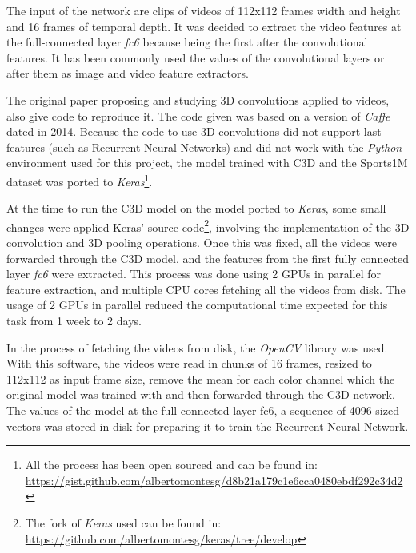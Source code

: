 The input of the network are clips of videos of 112x112 frames width and height and 16 frames of temporal depth. It was decided to extract the video features at the full-connected layer \textit{fc6} because being the first after the convolutional features. It has been commonly used the values of the convolutional layers or after them as image and video feature extractors.

The original paper proposing and studying 3D convolutions applied to videos, also give code to reproduce it. The code given was based on a version of \textit{Caffe}\cite{jia2014caffe} dated in 2014. Because the code to use 3D convolutions did not support last features (such as Recurrent Neural Networks) and did not work with the \textit{Python} environment used for this project, the model trained with C3D and the Sports1M\cite{KarpathyCVPR14} dataset was ported to \textit{Keras}\footnote{All the process has been open sourced and can be found in: \url{https://gist.github.com/albertomontesg/d8b21a179c1e6cca0480ebdf292c34d2}}.





At the time to run the C3D model on the model ported to \textit{Keras}, some small changes were applied Keras' source code\footnote{The fork of \textit{Keras} used can be found in: \url{https://github.com/albertomontesg/keras/tree/develop}}, involving the implementation of the 3D convolution and 3D pooling operations. Once this was fixed, all the videos were forwarded through the C3D model, and the features from the first fully connected layer \textit{fc6} were extracted. This process was done using 2 GPUs in parallel for feature extraction, and multiple CPU cores fetching all the videos from disk. The usage of 2 GPUs in parallel reduced the computational time expected for this task from 1 week to 2 days.


In the process of fetching the videos from disk, the \textit{OpenCV}\cite{opencv_library} library was used. With this software, the videos were read in chunks of 16 frames, resized to 112x112 as input frame size, remove the mean for each color channel which the original model was trained with and then forwarded through the C3D network. The values of the model at the full-connected layer fc6, a sequence of 4096-sized vectors was stored in disk for preparing it to train the Recurrent Neural Network. %

